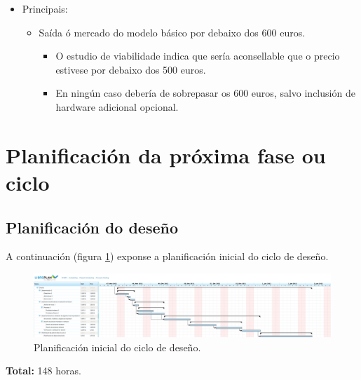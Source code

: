 \begin{itemize}
\begin{itemize}
          \item Principais:
                \begin{itemize}
                 \item Saída ó mercado do modelo básico por debaixo dos 600
                       euros.
                       \begin{itemize}
                        \item O estudio de viabilidade indica que sería
                              aconsellable que o precio estivese por debaixo
                              dos 500 euros.
                        \item En ningún caso debería de sobrepasar os 600
                              euros, salvo inclusión de hardware adicional
                              opcional.
                       \end{itemize}
                \end{itemize}
         \end{itemize}
  \end{itemize}

\section{Planificación da próxima fase ou ciclo}

 \subsection{Planificación do deseño}

 A continuación (figura \ref{figura:PlanificacionInicialDeseno}) exponse a
 planificación inicial do ciclo de deseño. \\

 \begin{figure}[htbp]
  \centering
  \includegraphics[scale=0.7,keepaspectratio=true,clip,trim=0cm 0cm 48cm 0m]{./imagenes/deseno.png}
  \caption{Planificación inicial do ciclo de deseño.}
  \label{figura:PlanificacionInicialDeseno}
 \end{figure}

 \textbf{Total:} 148 horas.

